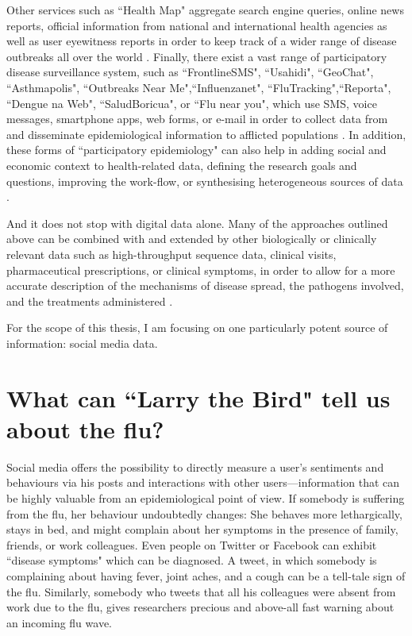 \documentclass[11pt, a4paper,twoside]{report}\usepackage[]{graphicx}\usepackage[]{color}
\begin{document}
Other services such as ``Health Map" aggregate search engine queries, online news reports, official information from national and international health agencies as well as user eyewitness reports in order to keep track of a wider range of disease outbreaks all over the world \citep{brownstein_surveillance_2008,freifeld_healthmap:_2008}. Finally, there exist a vast range of participatory disease surveillance system, such as ``FrontlineSMS", ``Usahidi", ``GeoChat", ``Asthmapolis", ``Outbreaks Near Me",``Influenzanet", ``FluTracking",``Reporta", ``Dengue na Web", ``SaludBoricua", or ``Flu near you", which use SMS, voice messages, smartphone apps, web forms, or e-mail in order to collect data from and disseminate epidemiological information to afflicted populations \citep{freifeld_participatory_2010,chunara_flu_2013,wojcik_public_2014,chunara_estimating_2015}. In addition, these forms of ``participatory epidemiology" can also help in adding social and economic context to health-related data, defining the research goals and questions, improving the work-flow, or synthesising heterogeneous sources of data \citep{bach_participatory_2017,liu_assessing_2017}.

And it does not stop with digital data alone. Many of the approaches outlined above can be combined with and extended by other biologically or clinically relevant data such as high-throughput sequence data, clinical visits, pharmaceutical prescriptions, or clinical symptoms, in order to allow for a more accurate description of the mechanisms of disease spread, the pathogens involved, and the treatments administered \citep{ray_network_2016}.

For the scope of this thesis, I am focusing on one particularly potent source of information: social media data.

\section{What can ``Larry the Bird" tell us about the flu?}
Social media offers the possibility to directly measure a user's sentiments and behaviours via his posts and interactions with other users---information that can be highly valuable from an epidemiological point of view. If somebody is suffering from the flu, her behaviour undoubtedly changes: She behaves more lethargically, stays in bed, and might complain about her symptoms in the presence of family, friends, or work colleagues. Even people on Twitter or Facebook can exhibit ``disease symptoms" which can be diagnosed. A tweet, in which somebody is complaining about having fever, joint aches, and a cough can be a tell-tale sign of the flu. Similarly, somebody who tweets that all his colleagues were absent from work due to the flu, gives researchers precious and above-all fast warning about an incoming flu wave.
\end{document}
